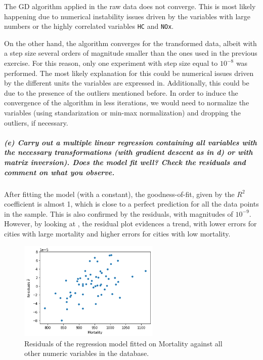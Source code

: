 \documentclass[11pt, english]{article}
\begin{document}
    The GD algorithm applied in the raw data does not converge. This is most
likely happening due to numerical instability issues driven by the
variables with large numbers or the highly correlated variables
\texttt{HC} and \texttt{NOx}.

On the other hand, the algorithm converges for the transformed data,
albeit with a step size several orders of magnitude smaller than the
ones used in the previous exercise. For this reason, only one experiment
with step size equal to \(10^{-8}\) was performed. The most likely
explanation for this could be numerical issues driven by the different
units the variables are expressed in. Additionally, this could be due to
the presence of the outliers mentioned before. In order to induce the
convergence of the algorithm in less iterations, we would need to
normalize the variables (using standarization or min-max normalization)
and dropping the outliers, if necessary.
   
    \hypertarget{e-carry-out-a-multiple-linear-regression-containing-all-variables-with-the-necessary-transformations-with-gradient-descent-as-in-d-or-with-matrix-inversion.-does-the-model-fit-well-check-the-residuals-and-comment-on-what-you-observe.}{%
\subparagraph{(e) Carry out a multiple linear regression containing all
variables with the necessary transformations (with gradient descent as
in d) or with matrix inversion). Does the model fit well? Check the
residuals and comment on what you
observe.\\[2ex]}\label{e-carry-out-a-multiple-linear-regression-containing-all-variables-with-the-necessary-transformations-with-gradient-descent-as-in-d-or-with-matrix-inversion.-does-the-model-fit-well-check-the-residuals-and-comment-on-what-you-observe.}}

    After fitting the model (with a constant), the goodness-of-fit, given by the \(R^2\)
coefficient is almost 1, which is close to a perfect prediction for all
the data points in the sample. This is also confirmed by the residuals,
with magnitudes of \(10^{-9}\). However, by looking at , the residual plot evidences a trend, with lower errors for cities with large mortality and higher errors for cities with low mortality.
	
\begin{figure}[H]
	\centering
	\includegraphics[width=0.6\textwidth]{residuals}
	\caption{Residuals of the regression model fitted on Mortality against all other numeric variables in the database.}
\end{figure}
	
\end{document}
